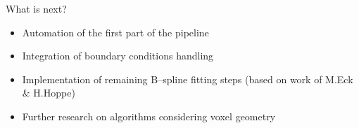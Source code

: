 \begin{frame}{What is next?}

\begin{itemize}
\item Automation of the first part of the pipeline
\item Integration of boundary conditions handling
\item Implementation of remaining B--spline fitting steps (based on work of M.Eck \& H.Hoppe)
\item Further research on algorithms considering voxel geometry
\end{itemize}

\end{frame}